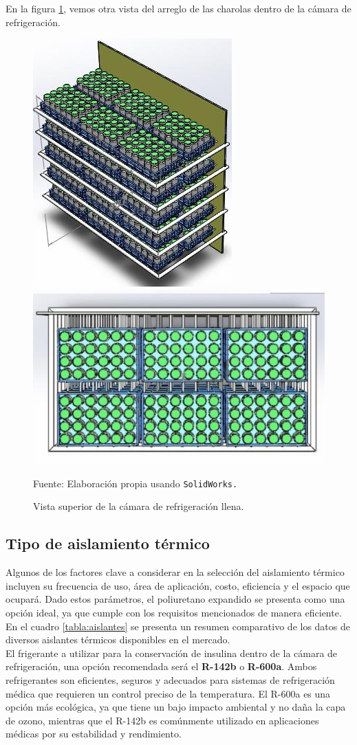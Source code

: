En la figura  \ref{fig:4-superiorlcharolas}, vemos otra vista del arreglo de las charolas dentro de la cámara de refrigeración.

\begin{figure}[H]
	\centering
	\includegraphics[width=0.5\linewidth]{figures/4-superiorlcharolas}\includegraphics[width=0.6\linewidth]{figures/4-superiorlcharolas2}
	\caption{Vista superior de la cámara de refrigeración llena.}
		Fuente: Elaboración propia usando \texttt{SolidWorks.}
	\label{fig:4-superiorlcharolas}
\end{figure}

 



\subsection{Tipo de aislamiento térmico}

Algunos de los factores clave a considerar en la selección del aislamiento térmico incluyen su frecuencia de uso, área de aplicación, costo, eficiencia y el espacio que ocupará. Dado estos parámetros, el poliuretano expandido se presenta como una opción ideal, ya que cumple con los requisitos mencionados de manera eficiente. En el cuadro \ref{tabla:aislantes} se presenta un resumen comparativo de los datos de diversos aislantes térmicos disponibles en el mercado.\\
El frigerante a utilizar para la conservación de insulina dentro de la cámara de refrigeración, una opción recomendada será el  \textbf{R-142b} o \textbf{R-600a}. Ambos refrigerantes son eficientes, seguros y adecuados para sistemas de refrigeración médica que requieren un control preciso de la temperatura. El R-600a es una opción más ecológica, ya que tiene un bajo impacto ambiental y no daña la capa de ozono, mientras que el R-142b es comúnmente utilizado en aplicaciones médicas por su estabilidad y rendimiento.

